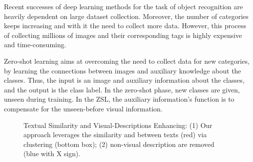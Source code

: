\documentclass[11pt,a4paper]{article}
\begin{document}
Recent successes of deep learning methods for the task of object recognition are heavily dependent on large dataset collection.
Moreover, the number of categories keeps increasing and with it the need to collect more data. However, this process of collecting millions of images and their corresponding tags is highly expensive and time-consuming. \par




Zero-shot learning aims at overcoming the need to collect data for new categories, by learning the connections between images and auxiliary knowledge about the classes. Thus, the input is an image and auxiliary information about the classes, and the output is the class label. In the zero-shot phase, new classes are given, unseen during training. In the ZSL, the auxiliary information's function is to compensate for the unseen-before visual information.
\par


\begin{figure}[th]
\centering
{}
 \caption{Textual Similarity and Visual-Descriptions Enhancing: (1) Our approach leverages the similarity and  between texts (red) via clustering (bottom box); (2) non-visual description are removed (blue with X sign). }
\label{fig:bird_example}%
\end{figure}
\end{document}
